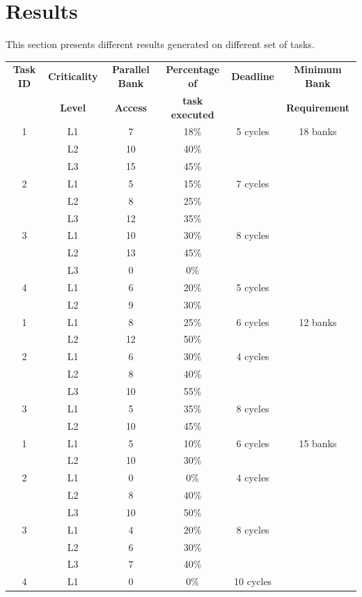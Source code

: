  \section{Results}\label{res}
 This section presents different results generated on different set of tasks. 
  
 \begin{table}[!htb]
 \begin{tabular}{|c|c|c|c|c|c|}\hline
 {\bf Task ID} & {\bf Criticality} & {\bf Parallel Bank}  & {\bf Percentage of} & {\bf Deadline} & {\bf Minimum Bank} \\
         & {\bf Level} & {\bf Access} & {\bf task executed} & & {\bf Requirement} \\ \hline
 1 & L1 & 7 & 18\% & 5 cycles & 18 banks\\
   & L2 & 10 & 40\% & & \\
   & L3 & 15 & 45\% & & \\ 
 2 & L1 & 5 & 15\% & 7 cycles & \\
   & L2 & 8 & 25\% & & \\
   & L3 & 12 & 35\% & & \\ 
 3 & L1 & 10 & 30\% & 8 cycles & \\
   & L2 & 13 & 45\% & & \\
   & L3 & 0 & 0\% & & \\ 
 4 & L1 & 6 & 20\% & 5 cycles & \\
   & L2 & 9 & 30\% & &\\ \hline
 1 & L1 & 8 & 25\% & 6 cycles & 12 banks\\
   & L2 & 12 & 50\% & & \\
 2 & L1 & 6 & 30\% & 4 cycles & \\
   & L2 & 8 & 40\% & & \\
   & L3 & 10 & 55\% & & \\ 
 3 & L1 & 5 & 35\% & 8 cycles & \\
   & L2 & 10 & 45\% & & \\ \hline
 1 & L1 & 5 & 10\% & 6 cycles& 15 banks\\
   & L2 & 10 & 30\% & & \\
 2 & L1 & 0 & 0\% & 4 cycles & \\
   & L2 & 8 & 40\% & & \\
   & L3 & 10 & 50\% & & \\ 
 3 & L1 & 4 & 20\% & 8 cycles & \\
   & L2 & 6 & 30\% & & \\
   & L3 & 7 & 40\% & & \\
 4 & L1 & 0 & 0\% & 10 cycles & \\

\end{tabular}
\end{table}
